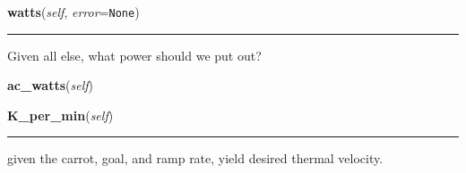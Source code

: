     \vspace{0.5ex}

    \begin{boxedminipage}{\textwidth}

    \raggedright \textbf{watts}(\textit{self}, \textit{error}=\texttt{None})

    \vspace{-1.5ex}

    \rule{\textwidth}{0.5\fboxrule}
    Given all else, what power should we put out?

    \vspace{1ex}

    \end{boxedminipage}

    \label{tempcontrol:tcontroller:ac_watts}

    \vspace{0.5ex}

    \begin{boxedminipage}{\textwidth}

    \raggedright \textbf{ac\_watts}(\textit{self})

    \end{boxedminipage}

    \label{tempcontrol:tcontroller:K_per_min}

    \vspace{0.5ex}

    \begin{boxedminipage}{\textwidth}

    \raggedright \textbf{K\_per\_min}(\textit{self})

    \vspace{-1.5ex}

    \rule{\textwidth}{0.5\fboxrule}
    given the carrot, goal, and ramp rate, yield desired thermal velocity.

    \vspace{1ex}

    \end{boxedminipage}

    \label{tempcontrol:tcontroller:r_power}

